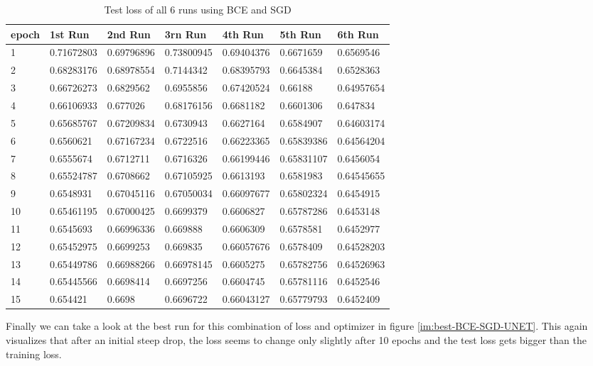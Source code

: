 \begin{table}[!ht]
    \centering
    \begin{tabular}{|l||l||l||l||l||l||l|}
    \hline
    epoch & 1st Run & 2nd Run & 3rn Run & 4th Run & 5th Run & 6th Run \\ \hline
        1 & 0.71672803 & 0.69796896 & 0.73800945 & 0.69404376 & 0.6671659 & 0.6569546 \\ \hline
        2 & 0.68283176 & 0.68978554 & 0.7144342 & 0.68395793 & 0.6645384 & 0.6528363 \\ \hline
        3 & 0.66726273 & 0.6829562 & 0.6955856 & 0.67420524 & 0.66188 & 0.64957654 \\ \hline
        4 & 0.66106933 & 0.677026 & 0.68176156 & 0.6681182 & 0.6601306 & 0.647834 \\ \hline
        5 & 0.65685767 & 0.67209834 & 0.6730943 & 0.6627164 & 0.6584907 & 0.64603174 \\ \hline
        6 & 0.6560621 & 0.67167234 & 0.6722516 & 0.66223365 & 0.65839386 & 0.64564204 \\ \hline
        7 & 0.6555674 & 0.6712711 & 0.6716326 & 0.66199446 & 0.65831107 & 0.6456054 \\ \hline
        8 & 0.65524787 & 0.6708662 & 0.67105925 & 0.6613193 & 0.6581983 & 0.64545655 \\ \hline
        9 & 0.6548931 & 0.67045116 & 0.67050034 & 0.66097677 & 0.65802324 & 0.6454915 \\ \hline
        10 & 0.65461195 & 0.67000425 & 0.6699379 & 0.6606827 & 0.65787286 & 0.6453148 \\ \hline
        11 & 0.6545693 & 0.66996336 & 0.669888 & 0.6606309 & 0.6578581 & 0.6452977 \\ \hline
        12 & 0.65452975 & 0.6699253 & 0.669835 & 0.66057676 & 0.6578409 & 0.64528203 \\ \hline
        13 & 0.65449786 & 0.66988266 & 0.66978145 & 0.6605275 & 0.65782756 & 0.64526963 \\ \hline
        14 & 0.65445566 & 0.6698414 & 0.6697256 & 0.6604745 & 0.65781116 & 0.6452546 \\ \hline
        15 & 0.654421 & 0.6698 & 0.6696722 & 0.66043127 & 0.65779793 & 0.6452409 \\ \hline
    \end{tabular}
    \caption{\label{tab:bce_sgd_test}Test loss of all 6 runs using BCE and SGD}
\end{table}

Finally we can take a look at the best run for this combination of loss and optimizer in figure 
\ref{im:best-BCE-SGD-UNET}. This again visualizes that after an initial steep drop, the loss seems to 
change only slightly after 10 epochs and the test loss gets bigger than the training loss.



